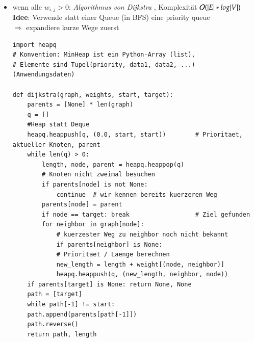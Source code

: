         \begin{itemize}
        \item wenn alle $w_{i, j} > 0$: \emph{Algorithmus von Dijkstra} , Komplexität $\mathcal{O}{}(|E| * log|V|)$ \\
        \textbf{Idee}: Verwende statt einer Queue (in BFS) eine priority queue \\
        $\Rightarrow$ expandiere kurze Wege zuerst
        \begin{verbatim}
import heapq
# Konvention: MinHeap ist ein Python-Array (list),
# Elemente sind Tupel(priority, data1, data2, ...) (Anwendungsdaten)

def dijkstra(graph, weights, start, target):
    parents = [None] * len(graph)
    q = []
    #Heap statt Deque
    heapq.heappush[q, (0.0, start, start))        # Prioritaet, aktueller Knoten, parent
    while len(q) > 0:
        length, node, parent = heapq.heappop(q)
        # Knoten nicht zweimal besuchen
        if parents[node] is not None:
            continue  # wir kennen bereits kuerzeren Weg
        parents[node] = parent
        if node == target: break                  # Ziel gefunden
        for neighbor in graph[node]:
            # kuerzester Weg zu neighbor noch nicht bekannt
            if parents[neighbor] is None:
            # Prioritaet / Laenge berechnen
            new_length = length + weight[(node, neighbor)]
            heapq.heappush(q, (new_length, neighbor, node))
    if parents[target] is None: return None, None
    path = [target]
    while path[-1] != start:
    path.append(parents[path[-1]])
    path.reverse()
    return path, length
        \end{verbatim}
        \end{itemize}

